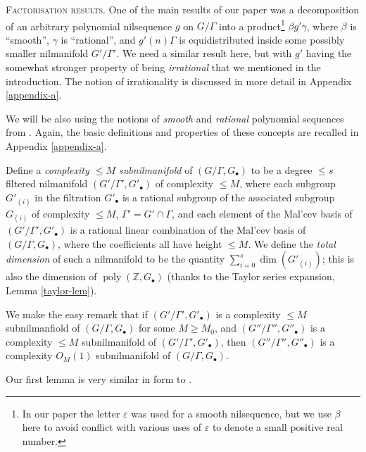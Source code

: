 \documentclass[11pt,reqno]{amsart}
\numberwithin{equation}{section}
\theoremstyle{plain}
\theoremstyle{definition}
\renewcommand{\leq}{\leqslant}
\renewcommand{\geq}{\geqslant}
\newcommand\Z{\mathbb{Z}}
\newcommand\1{{\bf 1}}
\newcommand\2{{\bf 2}}
\newcommand\eps{\varepsilon}
\newcommand\poly{\operatorname{poly}}
\begin{document}
\textsc{Factorisation results.} One of the main results of our paper \cite{green-tao-nilratner} was a decomposition of an arbitrary polynomial nilsequence $g$ on $G/\Gamma$ into a product\footnote{In our paper \cite{green-tao-nilratner} the letter $\eps$ was used for a smooth nilsequence, but we use $\beta$ here to avoid conflict with various uses of $\eps$ to denote a small positive real number.} $\beta g' \gamma$, where $\beta$ is ``smooth'', $\gamma$ is ``rational'', and $g'(n)\Gamma$ is equidistributed inside some possibly smaller nilmanifold $G'/\Gamma'$. We need a similar result here, but with $g'$ having the somewhat stronger property of being \emph{irrational} that we mentioned in the introduction. The notion of irrationality is discussed in more detail in Appendix \ref{appendix-a}.

We will be also using the notions of \emph{smooth} and \emph{rational} polynomial sequences from \cite{green-tao-nilratner}. Again, the basic definitions and properties of these concepts are recalled in Appendix \ref{appendix-a}.  

Define a \emph{complexity $\leq M$ subnilmanifold} of $(G/\Gamma,G_\bullet)$ to be a degree $\leq s$ filtered nilmanifold $(G'/\Gamma',G'_\bullet)$ of complexity $\leq M$, where each subgroup $G'_{(i)}$ in the filtration $G'_\bullet$ is a rational subgroup of the associated subgroup $G_{(i)}$ of complexity $\leq M$, $\Gamma' = G' \cap \Gamma$, and each element of the Mal'cev basis of $(G'/\Gamma',G'_\bullet)$ is a rational linear combination of the Mal'cev basis of $(G/\Gamma,G_\bullet)$, where the coefficients all have height $\leq M$.  We define the \emph{total dimension} of such a nilmanifold to be the quantity $\sum_{i=0}^s \dim(G'_{(i)})$; this is also the dimension of $\poly(\Z,G_\bullet)$ (thanks to the Taylor series expansion, Lemma \ref{taylor-lem}).  

We make the easy remark that if $(G'/\Gamma',G'_\bullet)$ is a complexity $\leq M$ subnilmanfiold of $(G/\Gamma,G_\bullet)$ for some $M \geq M_0$, and $(G''/\Gamma'',G''_\bullet)$ is a complexity $\leq M$ subnilmanifold of $(G'/\Gamma',G'_\bullet)$, then $(G''/\Gamma'',G''_\bullet)$ is a complexity $O_M(1)$ subnilmanifold of $(G/\Gamma,G_\bullet)$.

Our first lemma is very similar in form to \cite[Lemma 7.9]{green-tao-nilratner}.
\end{document}
